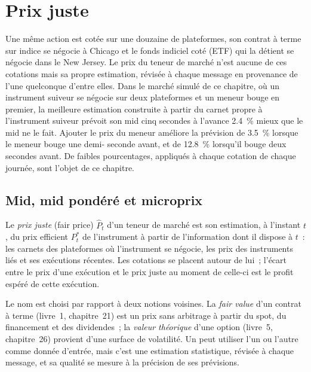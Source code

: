 \chapter{Prix juste}\label{ch:hf:fair-value}

Une même action est cotée sur une douzaine de plateformes, son contrat à terme sur indice se négocie à Chicago et le fonds indiciel coté (ETF) qui la détient se négocie dans le New Jersey. Le
prix du teneur de marché n'est aucune de ces cotations mais sa propre estimation, révisée à chaque message en provenance de l'une quelconque d'entre elles. Dans le marché simulé de ce chapitre,
où un instrument suiveur se négocie sur deux plateformes et un meneur bouge en premier, la meilleure estimation construite à partir du carnet propre à l'instrument suiveur prévoit
son mid cinq secondes à l'avance 2.4~\% mieux que le mid ne le fait. Ajouter le prix du meneur améliore la prévision de 3.5~\% lorsque le meneur bouge une demi-
seconde avant, et de 12.8~\% lorsqu'il bouge deux secondes avant. De faibles pourcentages, appliqués à chaque cotation de chaque journée, sont l'objet de ce chapitre.

\section{Mid, mid pondéré et microprix}

\begin{definition}\label{def:hf:fair-value:fair}
Le \emph{prix juste} (fair price) $\hat P_t$ d'un teneur de marché est son estimation, à l'instant $t$, du prix efficient $P^\ast_t$ de l'instrument
à partir de l'information dont il dispose à $t$~: les carnets des plateformes où l'instrument se négocie, les prix des instruments liés et ses exécutions récentes.
Les cotations se placent autour de lui~; l'écart entre le prix d'une exécution et le prix juste au moment de celle-ci est le profit espéré de cette exécution.
\end{definition}

Le nom est choisi par rapport à deux notions voisines. La \emph{fair value} d'un contrat à terme (livre~1, chapitre~21) est un prix sans arbitrage à partir du spot,
du financement et des dividendes~; la \emph{valeur théorique} d'une option (livre~5, chapitre~26) provient d'une surface de volatilité. Un  peut
utiliser l'un ou l'autre comme donnée d'entrée, mais c'est une estimation statistique, révisée à chaque message, et sa qualité se mesure à la précision de ses prévisions.

